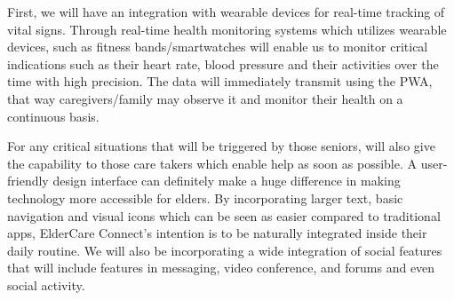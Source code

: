 \documentclass{article}
\begin{document}
First, we will have an integration with wearable devices for real-time tracking of vital signs. Through real-time health monitoring systems which utilizes wearable devices, such as fitness bands/smartwatches will enable us to monitor critical indications such as their heart rate, blood pressure and their activities over the time with high precision. The data will immediately transmit using the PWA, that way caregivers/family may observe it and monitor their health on a continuous basis.

For any critical situations that will be triggered by those seniors, will also give the capability to those care takers which enable help as soon as possible. A user-friendly design interface can definitely make a huge difference in making technology more accessible for elders. By incorporating larger text, basic navigation and visual icons which can be seen as easier compared to traditional apps, ElderCare Connect’s intention is to be naturally integrated inside their daily routine. We will also be incorporating a wide integration of social features that will include features in messaging, video conference, and forums and even social activity.
\end{document}
